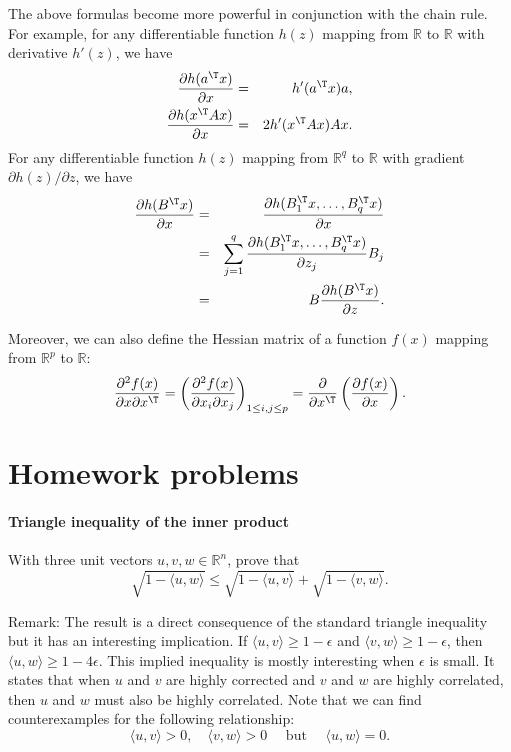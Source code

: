 The above formulas become more powerful in conjunction with the chain rule. For example, for any differentiable function $h(z)$ mapping from $\mathbb{R} $ to $ \mathbb{R}$ with derivative $h'(z)$, we have
\begin{eqnarray*}
\frac{ \partial h (a^{\T} x)  }{\partial  x}  &=& h'(a^{\T} x)  a,\\ 
\frac{ \partial  h( x^{\T} A x) }{ \partial  x} &=& 2h'( x^{\T} A x) Ax.
\end{eqnarray*}
For any differentiable function $h(z)$ mapping from $ \mathbb{R}^q $ to $ \mathbb{R}$ with gradient 
$\partial h(z) / \partial z$, we have
\begin{eqnarray*}
\frac{\partial h(B^{\T} x)  }{\partial  x} 
&=& \frac{\partial h(B_1^{\T} x, \ldots, B_q^{\T}x)  }{\partial  x} \\
&=& \sum_{j=1}^q \frac{\partial h(B_1^{\T} x, \ldots, B_q^{\T}x)  }{\partial  z_j} B_j \\
&=&  B \frac{ \partial h(B^{\T} x) }{  \partial z } . 
\end{eqnarray*}

Moreover, we can also define the Hessian matrix of a function $f(x)$ mapping from $\mathbb{R}^p$ to $\mathbb{R}$:
$$
\frac{  \partial^2 f(x) }{ \partial x \partial x^{\T} } = \left( \frac{  \partial^2 f(x) }{ \partial x_i \partial x_j} \right)_{1\leq i, j \leq p}
= \frac{ \partial }{ \partial x^{\T} } \left(  \frac{  \partial f(x) }{ \partial x }  \right). 
$$


\section{Homework problems}


\paragraph{Triangle inequality of the inner product}\label{hwmath1::triangle-inner-product}

With three unit vectors $u, v, w  \in \mathbb{R}^n$, prove that
$$
\sqrt{ 1 -  \langle  u, w  \rangle } \leq \sqrt{  1 -   \langle  u, v  \rangle } + \sqrt{  1 -   \langle   v, w  \rangle }.
$$


Remark: The result is a direct consequence of the standard triangle inequality but it has an interesting implication. If $ \langle  u, v  \rangle  \geq 1-\epsilon$ and  $  \langle   v, w  \rangle \geq 1 - \epsilon$, then $\langle  u, w  \rangle \geq 1-4\epsilon$. This implied inequality is mostly interesting when $\epsilon $ is small. It states that when $u$ and $v$ are highly corrected and $v$ and $w$ are highly correlated, then $u$ and $w$ must also be highly correlated. Note that we can find counterexamples for the following relationship:
$$
\langle  u, v  \rangle > 0, \quad  \langle   v, w  \rangle  > 0 \quad   \text{ but }\quad   \langle  u, w  \rangle = 0. 
$$



